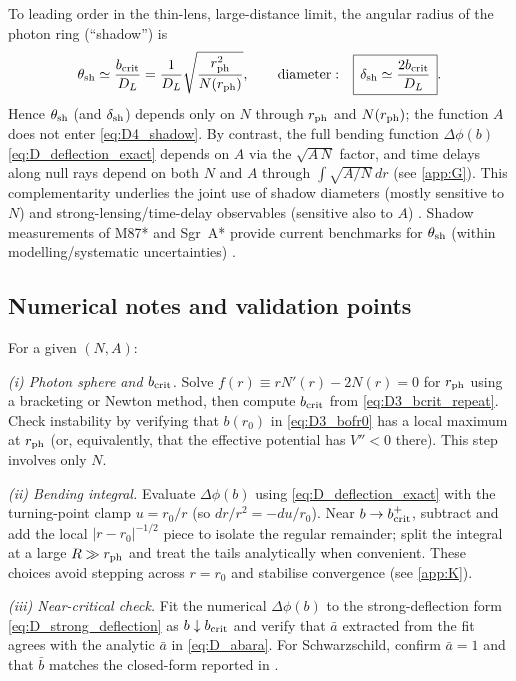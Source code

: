 \documentclass{iopjournal}
\begin{document}
To leading order in the thin-lens, large-distance limit, the angular radius of the photon ring (``shadow'') is
\begin{equation}
\theta_{\rm sh}\simeq \frac{b_{\rm crit}}{D_L}=\frac{1}{D_L}\sqrt{\frac{r_{\rm ph}^2}{N(r_{\rm ph})}},
\qquad
\mathrm{diameter:}\quad \boxed{\,\delta_{\rm sh}\simeq \frac{2b_{\rm crit}}{D_L}\,}.
\label{eq:D4_shadow}
\end{equation}
Hence $\theta_{\rm sh}$ (and $\delta_{\rm sh}$) depends only on $N$ through $r_{\rm ph}$ and $N(r_{\rm ph})$; the function $A$ does not enter \eqref{eq:D4_shadow}. By contrast, the full bending function $\Delta\phi(b)$ \eqref{eq:D_deflection_exact} depends on $A$ via the $\sqrt{A\,N}$ factor, and time delays along null rays depend on both $N$ and $A$ through $\int\!\sqrt{A/N}\,dr$ (see \cref{app:G}). This complementarity underlies the joint use of shadow diameters (mostly sensitive to $N$) and strong-lensing/time-delay observables (sensitive also to $A$) \cite{Perlick2004LRR,VirbhadraEllis2000,Bozza2002PRD}. Shadow measurements of M87* and Sgr~A* provide current benchmarks for $\theta_{\rm sh}$ (within modelling/systematic uncertainties) \cite{EHT2019M87,EHT2022SgrA}.

\subsection{Numerical notes and validation points}\label{app:D5}

For a given $(N,A)$:

\emph{(i) Photon sphere and $b_{\rm crit}$.} Solve $f(r)\equiv rN'(r)-2N(r)=0$ for $r_{\rm ph}$ using a bracketing or Newton method, then compute $b_{\rm crit}$ from \eqref{eq:D3_bcrit_repeat}. Check instability by verifying that $b(r_0)$ in \eqref{eq:D3_bofr0} has a local maximum at $r_{\rm ph}$ (or, equivalently, that the effective potential has $V''<0$ there). This step involves only $N$.

\emph{(ii) Bending integral.} Evaluate $\Delta\phi(b)$ using \eqref{eq:D_deflection_exact} with the turning-point clamp $u=r_0/r$ (so $dr/r^2=-du/r_0$). Near $b\to b_{\rm crit}^+$, subtract and add the local $|r-r_0|^{-1/2}$ piece to isolate the regular remainder; split the integral at a large $R\gg r_{\rm ph}$ and treat the tails analytically when convenient. These choices avoid stepping across $r=r_0$ and stabilise convergence (see \cref{app:K}).

\emph{(iii) Near-critical check.} Fit the numerical $\Delta\phi(b)$ to the strong-deflection form \eqref{eq:D_strong_deflection} as $b\downarrow b_{\rm crit}$ and verify that $\bar a$ extracted from the fit agrees with the analytic $\bar a$ in \eqref{eq:D_abara}. For Schwarzschild, confirm $\bar a=1$ and that $\bar b$ matches the closed-form reported in \cite{Bozza2002PRD}.
\end{document}
